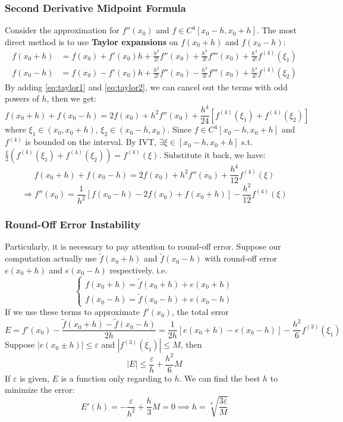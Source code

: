 \documentclass[12pt, a4paper]{article}
\theoremstyle{break}
\begin{document}
\subsubsection*{Second Derivative Midpoint Formula}
Consider the approximation for $f''(x_0)$ and $f \in C^4[x_0-h, x_0+h]$. The most direct method is to use \textbf{Taylor expansions} on $f(x_0+h)$ and $f(x_0-h)$:
\begin{align}
f(x_0+h) &= f(x_0) + f'(x_0)h + \frac{h^2}{2!}f''(x_0) + \frac{h^3}{3!}f'''(x_0) + \frac{h^4}{4!}f^{(4)}(\xi_1) \label{eq:taylor1} \\
f(x_0-h) &= f(x_0) - f'(x_0)h + \frac{h^2}{2!}f''(x_0) - \frac{h^3}{3!}f'''(x_0) + \frac{h^4}{4!}f^{(4)}(\xi_2) \label{eq:taylor2}
\end{align}
By adding \eqref{eq:taylor1} and \eqref{eq:taylor2}, we can cancel out the terms with odd powers of $h$, then we get:
\[ f(x_0+h) + f(x_0-h) = 2f(x_0) + h^2 f''(x_0) + \frac{h^4}{24}[f^{(4)}(\xi_1) + f^{(4)}(\xi_2)] \]
where $\xi_1 \in (x_0, x_0+h)$, $\xi_2 \in (x_0-h, x_0)$. Since $f \in C^4[x_0-h, x_0+h]$ and $f^{(4)}$ is bounded on the interval. By IVT, $\exists \xi \in [x_0-h, x_0+h]$ s.t. $\frac{1}{2}(f^{(4)}(\xi_1) + f^{(4)}(\xi_2)) = f^{(4)}(\xi)$. Substitute it back, we have:
\[ f(x_0+h) + f(x_0-h) = 2f(x_0) + h^2 f''(x_0) + \frac{h^4}{12} f^{(4)}(\xi) \]
\[ \Rightarrow f''(x_0) = \frac{1}{h^2}[f(x_0-h) - 2f(x_0) + f(x_0+h)] - \frac{h^2}{12}f^{(4)}(\xi) \]

\subsubsection*{Round-Off Error Instability}
Particularly, it is necessary to pay attention to round-off error. Suppose our computation actually use $\tilde{f}(x_0+h)$ and $\tilde{f}(x_0-h)$ with round-off error $e(x_0+h)$ and $e(x_0-h)$ respectively. i.e.
\[ \begin{cases} f(x_0+h) = \tilde{f}(x_0+h) + e(x_0+h) \\ f(x_0-h) = \tilde{f}(x_0-h) + e(x_0-h) \end{cases} \]
If we use these terms to approximate $f'(x_0)$, the total error
\[ E = f'(x_0) - \frac{\tilde{f}(x_0+h) - \tilde{f}(x_0-h)}{2h} = \frac{1}{2h}[e(x_0+h) - e(x_0-h)] - \frac{h^2}{6}f^{(3)}(\xi_1) \]
Suppose $|e(x_0 \pm h)| \le \varepsilon$ and $|f^{(3)}(\xi_1)| \le M$, then
\[ |E| \le \frac{\varepsilon}{h} + \frac{h^2}{6}M \]
If $\varepsilon$ is given, $E$ is a function only regarding to $h$. We can find the best $h$ to minimize the error:
\[ E'(h) = -\frac{\varepsilon}{h^2} + \frac{h}{3}M = 0 \implies h = \sqrt[3]{\frac{3\varepsilon}{M}} \]
\end{document}
